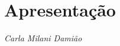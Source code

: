 




\chapter*{Apresentação}

\begin{flushright}
{\bigskip\small\itshape\hfill {Carla Milani Damião}}\smallskip
\end{flushright}

